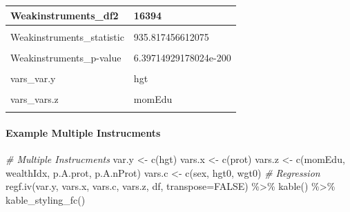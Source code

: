 \documentclass[
]{book}
\newenvironment{Shaded}{\begin{snugshade}}{\end{snugshade}}
\newcommand{\AttributeTok}[1]{\textcolor[rgb]{0.77,0.63,0.00}{#1}}
\newcommand{\CommentTok}[1]{\textcolor[rgb]{0.56,0.35,0.01}{\textit{#1}}}
\newcommand{\ConstantTok}[1]{\textcolor[rgb]{0.00,0.00,0.00}{#1}}
\newcommand{\FunctionTok}[1]{\textcolor[rgb]{0.00,0.00,0.00}{#1}}
\newcommand{\NormalTok}[1]{#1}
\newcommand{\OtherTok}[1]{\textcolor[rgb]{0.56,0.35,0.01}{#1}}
\newcommand{\SpecialCharTok}[1]{\textcolor[rgb]{0.00,0.00,0.00}{#1}}
\newcommand{\StringTok}[1]{\textcolor[rgb]{0.31,0.60,0.02}{#1}}
\begin{document}
\begin{table}[!h]
\begin{tabular}{l|l}
\hline
Weakinstruments\_df2 & 16394\\
\hline
\cellcolor{gray!6}{Wu-Hausman\_df2} & \cellcolor{gray!6}{16393}\\
\hline
Weakinstruments\_statistic & 935.817456612075\\
\hline
\cellcolor{gray!6}{Wu-Hausman\_statistic} & \cellcolor{gray!6}{123.595856606729}\\
\hline
Weakinstruments\_p-value & 6.39714929178024e-200\\
\hline
\cellcolor{gray!6}{Wu-Hausman\_p-value} & \cellcolor{gray!6}{1.30703637796748e-28}\\
\hline
vars\_var.y & hgt\\
\hline
\cellcolor{gray!6}{vars\_vars.x} & \cellcolor{gray!6}{prot}\\
\hline
vars\_vars.z & momEdu\\
\hline
\cellcolor{gray!6}{vars\_vars.c} & \cellcolor{gray!6}{sex+hgt0+wgt0}\\
\hline
\end{tabular}
\end{table}

\hypertarget{example-multiple-instrucments}{%
\paragraph{Example Multiple Instrucments}\label{example-multiple-instrucments}}

\begin{Shaded}
\begin{Highlighting}[]
\CommentTok{\# Multiple Instrucments}
\NormalTok{var.y }\OtherTok{\textless{}{-}} \FunctionTok{c}\NormalTok{(}\StringTok{\textquotesingle{}hgt\textquotesingle{}}\NormalTok{)}
\NormalTok{vars.x }\OtherTok{\textless{}{-}} \FunctionTok{c}\NormalTok{(}\StringTok{\textquotesingle{}prot\textquotesingle{}}\NormalTok{)}
\NormalTok{vars.z }\OtherTok{\textless{}{-}} \FunctionTok{c}\NormalTok{(}\StringTok{\textquotesingle{}momEdu\textquotesingle{}}\NormalTok{, }\StringTok{\textquotesingle{}wealthIdx\textquotesingle{}}\NormalTok{, }\StringTok{\textquotesingle{}p.A.prot\textquotesingle{}}\NormalTok{, }\StringTok{\textquotesingle{}p.A.nProt\textquotesingle{}}\NormalTok{)}
\NormalTok{vars.c }\OtherTok{\textless{}{-}} \FunctionTok{c}\NormalTok{(}\StringTok{\textquotesingle{}sex\textquotesingle{}}\NormalTok{, }\StringTok{\textquotesingle{}hgt0\textquotesingle{}}\NormalTok{, }\StringTok{\textquotesingle{}wgt0\textquotesingle{}}\NormalTok{)}
\CommentTok{\# Regression}
\FunctionTok{regf.iv}\NormalTok{(var.y, vars.x, vars.c, vars.z, df, }\AttributeTok{transpose=}\ConstantTok{FALSE}\NormalTok{) }\SpecialCharTok{\%\textgreater{}\%}
  \FunctionTok{kable}\NormalTok{() }\SpecialCharTok{\%\textgreater{}\%}
  \FunctionTok{kable\_styling\_fc}\NormalTok{()}
\end{Highlighting}
\end{Shaded}
\end{document}
